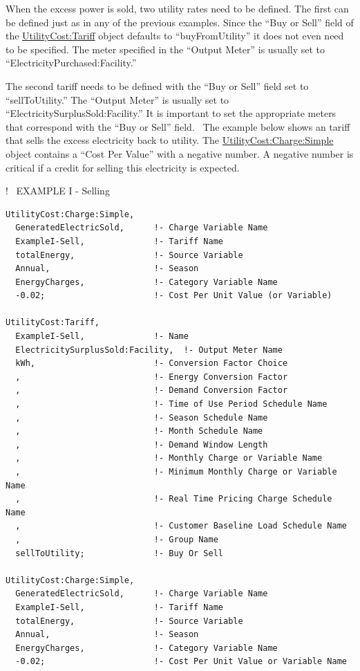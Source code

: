 When the excess power is sold, two utility rates need to be defined. The first can be defined just as in any of the previous examples. Since the ``Buy or Sell'' field of the \hyperref[utilitycosttariff]{UtilityCost:Tariff} object defaults to ``buyFromUtility'' it does not even need to be specified. The meter specified in the ``Output Meter'' is usually set to ``ElectricityPurchased:Facility.''

The second tariff needs to be defined with the ``Buy or Sell'' field set to ``sellToUtility.'' The ``Output Meter'' is usually set to ``ElectricitySurplusSold:Facility.'' It is important to set the appropriate meters that correspond with the ``Buy or Sell'' field.~ The example below shows an tariff that sells the excess electricity back to utility. The \hyperref[utilitycostchargesimple]{UtilityCost:Charge:Simple} object contains a ``Cost Per Value'' with a negative number. A negative number is critical if a credit for selling this electricity is expected.

!~ EXAMPLE I - Selling

\begin{lstlisting}
UtilityCost:Charge:Simple,
  GeneratedElectricSold,      !- Charge Variable Name
  ExampleI-Sell,              !- Tariff Name
  totalEnergy,                !- Source Variable
  Annual,                     !- Season
  EnergyCharges,              !- Category Variable Name
  -0.02;                      !- Cost Per Unit Value (or Variable)

UtilityCost:Tariff,
  ExampleI-Sell,              !- Name
  ElectricitySurplusSold:Facility,  !- Output Meter Name
  kWh,                        !- Conversion Factor Choice
  ,                           !- Energy Conversion Factor
  ,                           !- Demand Conversion Factor
  ,                           !- Time of Use Period Schedule Name
  ,                           !- Season Schedule Name
  ,                           !- Month Schedule Name
  ,                           !- Demand Window Length
  ,                           !- Monthly Charge or Variable Name
  ,                           !- Minimum Monthly Charge or Variable Name
  ,                           !- Real Time Pricing Charge Schedule Name
  ,                           !- Customer Baseline Load Schedule Name
  ,                           !- Group Name
  sellToUtility;              !- Buy Or Sell

UtilityCost:Charge:Simple,
  GeneratedElectricSold,      !- Charge Variable Name
  ExampleI-Sell,              !- Tariff Name
  totalEnergy,                !- Source Variable
  Annual,                     !- Season
  EnergyCharges,              !- Category Variable Name
  -0.02;                      !- Cost Per Unit Value or Variable Name
\end{lstlisting}

